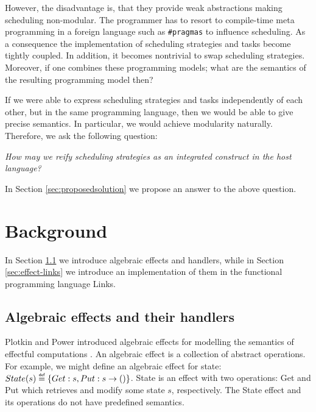 \documentclass[preprint,10pt,numbers]{sigplanconf}
\newcommand{\defas}[0]{\mathrel{\overset{\makebox[0pt]{\mbox{\normalfont\tiny\sffamily def}}}{=}}} %
\begin{document}
However, the disadvantage is, that they provide weak abstractions making scheduling non-modular. The programmer has to resort to compile-time meta programming in a foreign language such as \texttt{\#pragmas} to influence scheduling. As a consequence the implementation of scheduling strategies and tasks become tightly coupled. In addition, it becomes nontrivial to swap scheduling strategies. Moreover, if one combines these programming models; what are the semantics of the resulting programming model then?

If we were able to express scheduling strategies and tasks independently of each other, but in the same programming language, then we would be able to give precise semantics. In particular, we would achieve modularity naturally. Therefore, we ask the following question:
\begin{center}
  \emph{How may we reify scheduling strategies as an integrated construct in the host language?}
\end{center}
In Section \ref{sec:proposedsolution} we propose an answer to the above question.

\section{Background}\label{sec:background}
In Section \ref{sec:effects-and-handlers} we introduce algebraic effects and handlers, while in Section \ref{sec:effect-links} we introduce an implementation of them in the functional programming language Links.

\subsection{Algebraic effects and their handlers}\label{sec:effects-and-handlers}
Plotkin and Power introduced algebraic effects \cite{Plotkin2001} for modelling the semantics of effectful computations \cite{Lindley2014}. An algebraic effect is a collection of abstract operations. For example, we might define an algebraic effect for state: $State(s) \defas \{Get:s,Put:s \to ()\}$. State is an effect with two operations: Get and Put which retrieves and modify some state $s$, respectively. The State effect and its operations do not have predefined semantics.
\end{document}
